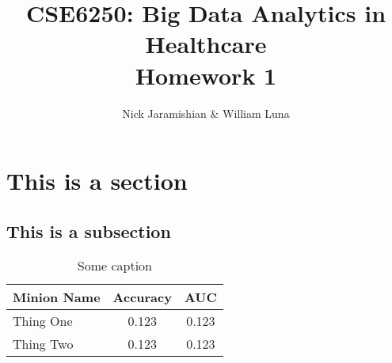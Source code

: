 \documentclass[12pt]{article}
\title{CSE6250: Big Data Analytics in Healthcare \\ Homework 1}
\author{Nick Jaramishian & William Luna}
\begin{document}
\maketitle

\section{This is a section}
\subsection{This is a subsection}

\begin{table}[h]
\centering
\begin{tabular}{@{}lcc@{}}
\toprule
Minion Name & Accuracy & AUC  \\ \midrule
Thing One & 0.123 & 0.123 \\
Thing Two & 0.123 & 0.123 \\
\bottomrule
\end{tabular}
\caption{Some caption}
\label{tbl:cv}
\end{table} 
\end{document}

